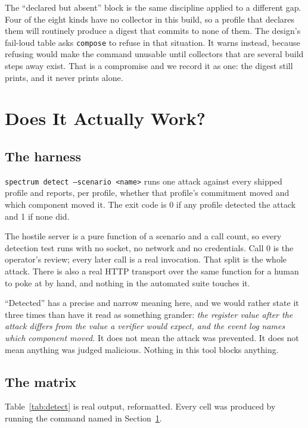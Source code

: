 \documentclass[11pt]{article}
\begin{document}
The ``declared but absent'' block is the same discipline applied to a
different gap. Four of the eight kinds have no collector in this build, so a
profile that declares them will routinely produce a digest that commits to
none of them. The design's fail-loud table asks \texttt{compose} to refuse in
that situation. It warns instead, because refusing would make the command
unusable until collectors that are several build steps away exist. That is a
compromise and we record it as one: the digest still prints, and it never
prints alone.

\section{Does It Actually Work?}
\label{sec:works}

\subsection{The harness}

\texttt{spectrum detect --scenario <name>} runs one attack against every
shipped profile and reports, per profile, whether that profile's commitment
moved and which component moved it. The exit code is 0 if any profile detected
the attack and 1 if none did.

The hostile server is a pure function of a scenario and a call count, so every
detection test runs with no socket, no network and no credentials. Call 0 is
the operator's review; every later call is a real invocation. That split is
the whole attack. There is also a real HTTP transport over the same function
for a human to poke at by hand, and nothing in the automated suite touches it.

``Detected'' has a precise and narrow meaning here, and we would rather state
it three times than have it read as something grander: \emph{the register
value after the attack differs from the value a verifier would expect, and the
event log names which component moved.} It does not mean the attack was
prevented. It does not mean anything was judged malicious. Nothing in this
tool blocks anything.

\subsection{The matrix}

Table~\ref{tab:detect} is real output, reformatted. Every cell was produced by
running the command named in Section~\ref{sec:works}.
\end{document}
